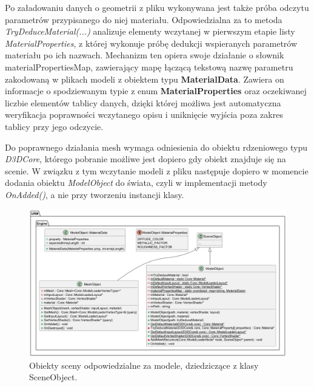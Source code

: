 	Po załadowaniu danych o geometrii z pliku wykonywana jest także próba odczytu parametrów przypisanego do niej materiału. Odpowiedzialna za to metoda \textit{TryDeduceMaterial(...)} analizuje elementy wczytanej w pierwszym etapie listy \textit{MaterialProperties}, z której wykonuje próbę dedukcji wspieranych parametrów materiału po ich nazwach. Mechanizm ten opiera swoje działanie o słownik materialPropertiesMap, zawierający mapę łączącą tekstową nazwę parametru zakodowaną w plikach modeli z obiektem typu \textbf{MaterialData}. Zawiera on informacje o spodziewanym typie z enum \textbf{MaterialProperties} oraz oczekiwanej liczbie elementów tablicy danych, dzięki której możliwa jest automatyczna weryfikacja poprawności wczytanego opisu i uniknięcie wyjścia poza zakres tablicy przy jego odczycie.
	
	Do poprawnego działania mesh wymaga odniesienia do obiektu rdzeniowego typu \textit{D3DCore}, którego pobranie możliwe jest dopiero gdy obiekt znajduje się na scenie. W związku z tym wczytanie modeli z pliku następuje dopiero w momencie dodania obiektu \textit{ModelObject} do świata, czyli w implementacji metody \textit{OnAdded()}, a nie przy tworzeniu instancji klasy.
	
	\begin{figure}[h!]
		\centering
		\includegraphics[width=\textwidth]{images/UML/sceneobjects_model.png}
		\caption{Obiekty sceny odpowiedzialne za modele, dziedziczące z klasy SceneObject.}
		\label{UML_SceneObjects_Model}
	\end{figure}

